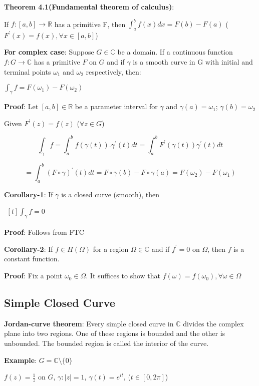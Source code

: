 \documentclass{article}
\begin{document}
\begin{flushleft}
\textbf{Theorem 4.1(Fundamental theorem of calculus)}: 

If $f:[a,b]\rightarrow \mathds{R}$ has a primitive F, then $\int_{a}^{b} f(x) dx =F(b)-F(a)$ \: ($F^{'}(x)=f(x), \forall x\in [a,b]$)

\textbf{For complex case}: Suppose $G\in \mathds{C}$ be a domain. If a continuous function $f:G\rightarrow \mathds{C}$ has a primitive $F$ on $G$ and if $\gamma$ is a smooth curve in G with initial and terminal points $\omega_1$ and $\omega_2$ respectively, then:

$\int_{\gamma}^{} f = F(\omega_1) - F(\omega_2)$

\textbf{Proof}: Let $[a,b]\in \mathds{R}$ be a parameter interval for $\gamma$ and $\gamma(a)=\omega_1$; $\gamma(b)=\omega_2$

Given $F^{'}(z)=f(z)$   ($\forall z \in G$)

$$\int_{\gamma}^{} f = \int_{a}^{b} f(\gamma(t)).\gamma^{'}(t) dt = \int_{a}^{b} F^{'}(\gamma(t))\gamma^{'}(t) dt$$

$$= \int_{a}^{b} (F \circ \gamma)^{'}(t) dt = F \circ \gamma(b)-F \circ \gamma(a)= F(\omega_2)-F(\omega_1)$$

\textbf{Corollary-1}: If $\gamma$ is a closed curve (smooth), then

$\begin{aligned}[t] \int_{\gamma}^{} f =0\nonumber \end{aligned}$ 

\textbf{Proof}: Follows from FTC

\textbf{Corollary-2}: If $f\in H(\Omega)$ for a region $\Omega\in \mathds{C}$ and if $f^{'}=0$ on $\Omega$, then $f$ is a constant function.

\textbf{Proof}: Fix a point $\omega_0\in \Omega$. It suffices to show that $f(\omega)=f(\omega_0), \forall \omega \in \Omega$

\subsection{\textbf{Simple Closed Curve}}

\textbf{Jordan-curve theorem}: Every simple closed curve in $\mathds{C}$ divides the complex plane into two regions. One of these regions is bounded and the other is unbounded. The bounded region is called the interior of the curve.

\textbf{Example}: $G=\mathds{C}\setminus \{0\}$

$f(z)=\frac{1}{z}$ on $G$, $\gamma: |z|=1$, $\gamma(t)=e^{it}$, ($t\in [0,2\pi]$)


\end{flushleft}
\end{document}
